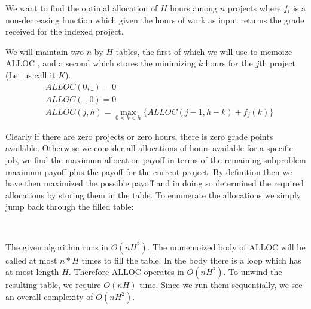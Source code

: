 \documentclass{amsart}
\theoremstyle{definition}
\theoremstyle{remark}
\numberwithin{equation}{section}
\begin{document}
We want to find the optimal allocation of $H$ hours among $n$ projects where $f_i$ is a non-decreasing function which given the hours of work as input returns the grade received for the indexed project.

We will maintain two $n$ by $H$ tables, the first of which we will use to memoize ALLOC , and a second which stores the minimizing $k$ hours for the $j$th project (Let us call it $K$).
\algstar
\begin{align*}
  & ALLOC(0,\_) = 0 \\ 
  & ALLOC(\_,0) = 0 \\
  & ALLOC(j,h) =
    \max_{0<k<h} \{ ALLOC(j-1, h-k) + f_j(k) \} 
\end{align*}

Clearly if there are zero projects or zero hours, there is zero grade points available. Otherwise we consider all allocations of hours available for a specific job, we find the maximum allocation payoff in terms of the remaining subproblem maximum payoff plus the payoff for the current project. By definition then we have then maximized the possible payoff and in doing so determined the required allocations by storing them in the table. To enumerate the allocations we simply jump back through the filled table: \\


\begin{algorithm}








  \EndWhile\\
\end{algorithm}

\claimstar The given algorithm runs in $O(nH^2)$.
The unmemoized body of ALLOC will be called at most $n*H$ times to fill the table. In the body there is a loop which has at most length $H$. Therefore ALLOC operates in $O(nH^2)$. To unwind the resulting table, we require $O(nH)$ time. Since we run them sequentially, we see an overall complexity of $O(nH^2)$.

\
\end{document}
